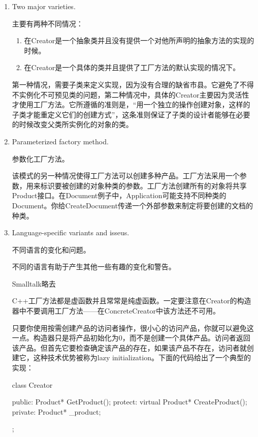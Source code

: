 \begin{enumerate}
	\item Two major varieties.

		  主要有两种不同情况：

		  \begin{enumerate}
		  		\item 在Creator是一个抽象类并且没有提供一个对他所声明的抽象方法的实现的时候。

				\item 在Creator是一个具体的类并且提供了工厂方法的默认实现的情况下。
		  \end{enumerate}

   		  第一种情况，需要子类来定义实现，因为没有合理的缺省市县。它避免了不得不实例化不可预见类的问题，第二种情况中，具体的Creator主要因为灵活性才使用工厂方法。它所遵循的准则是，“用一个独立的操作创建对象，这样的子类才能重定义它们的创建方式”，这条准则保证了子类的设计者能够在必要的时候改变父类所实例化的对象的类。

	\item Parameterized factory method.
		  
		  参数化工厂方法。

		  该模式的另一种情况使得工厂方法可以创建多种产品。工厂方法采用一个参数，用来标识要被创建的对象种类的参数。工厂方法创建所有的对象将共享Product接口。在Document例子中，Application可能支持不同种类的Document。你给CreateDocument传递一个外部参数来制定将要创建的文档的种类。

	\item Language-specific variants and isseus.

	      不同语言的变化和问题。

		  不同的语言有助于产生其他一些有趣的变化和警告。

		  Smalltalk略去

		  C++工厂方法都是虚函数并且常常是纯虚函数。一定要注意在Creator的构造器中不要调用工厂方法——在ConcreteCreator中该方法还不可用。

		  只要你使用按需创建产品的访问者操作，很小心的访问产品，你就可以避免这一点。构造器只是将产品初始化为0，而不是创建一个具体产品。访问者返回该产品。但首先它要检查确定该产品的存在，如果该产品不存在，访问者就创建它，这种技术优势被称为lazy initialization。下面的代码给出了一个典型的实现：

\begin{schemedisplay}
class Creator{
	public:
		Product* GetProduct();
	protect:
		virtual Product* CreateProduct();
	private:
		Product* _product;
		  	
};


\end{schemedisplay}
\end{enumerate}

